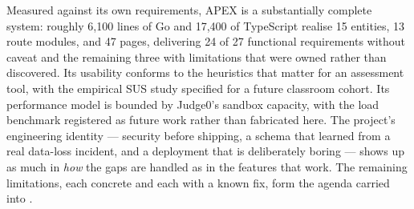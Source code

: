Measured against its own requirements, APEX is a substantially complete system:
roughly 6{,}100 lines of Go and 17{,}400 of TypeScript realise 15 entities, 13 route
modules, and 47 pages, delivering 24 of 27 functional requirements without caveat and
the remaining three with limitations that were owned rather than discovered. Its
usability conforms to the heuristics that matter for an assessment tool, with the
empirical SUS study specified for a future classroom cohort. Its performance model is
bounded by Judge0's sandbox capacity, with the load benchmark registered as
future work rather than fabricated here. The project's engineering identity ---
security before shipping, a schema that learned from a real data-loss incident, and a
deployment that is deliberately boring --- shows up as much in \emph{how} the gaps are
handled as in the features that work. The remaining limitations, each concrete and
each with a known fix, form the agenda carried into .
